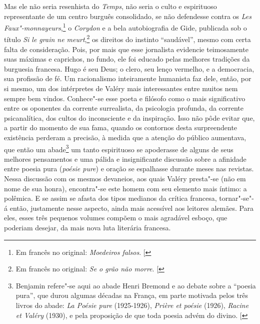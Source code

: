 Mas ele não seria resenhista do \emph{Temps}, não seria o culto e
espirituoso representante de um centro burguês consolidado, se não
defendesse contra os \emph{Les Faux"-monnayeurs},\footnote{Em francês no original: \emph{Moedeiros falsos}. {[}\versal{N. T.}{]}} o \emph{Corydon} e a bela
autobiografia de Gide, publicada sob o título \emph{Si le grain ne meurt},\footnote{Em francês no original: \emph{Se o grão não
morre}. {[}\versal{N. T.}{]}} os direitos do instinto ``saudável'', mesmo com certa falta de
consideração. Pois, por mais que esse jornalista evidencie teimosamente
suas máximas e caprichos, no fundo, ele foi educado pelas melhores
tradições da burguesia francesa. Hugo é seu Deus; o clero, seu lenço
vermelho, e a democracia, sua profissão de fé. Um racionalismo
inteiramente humanista faz dele, então, por si mesmo, um dos intérpretes
de Valéry mais interessantes entre muitos nem sempre bem vindos.
Conhece"-se esse poeta e filósofo como o mais significativo entre os
oponentes da corrente surrealista, da psicologia profunda, da corrente
psicanalítica, dos cultos do inconsciente e da inspiração. Isso não pôde
evitar que, a partir do momento de sua fama, quando os contornos desta
surpreendente existência perderam a precisão, à medida que a atenção do
público aumentava, que então um abade\footnote{Benjamin refere"-se aqui
  ao abade Henri Bremond e ao debate sobre a ``poesia pura'', que durou
  algumas décadas na França, em parte motivada pelos três livros do
  abade: \emph{La Poésie pure} (1925-1926), \emph{Prière et poésie}
  (1926), \emph{Racine et Valéry} (1930), e pela proposição de que toda
  poesia advém do divino. {[}\versal{N. E.}{]}} um tanto espirituoso se
apoderasse de alguns de seus melhores pensamentos e uma pálida e
insignificante discussão sobre a afinidade entre poesia pura
(\emph{poésie pure}) e oração se espalhasse durante meses nas revistas.
Nessa discussão com os mesmos devaneios, aos quais Valéry presta"-se (não
em nome de sua honra), encontra"-se este homem com seu elemento mais íntimo: a
polêmica. E se assim se afasta dos tipos medianos da crítica francesa,
tornar"-se"-á então, justamente nesse aspecto, ainda mais acessível aos
leitores alemães. Para eles, esses três pequenos volumes compõem o mais
agradável esboço, que poderiam desejar, da mais nova luta literária
francesa.
